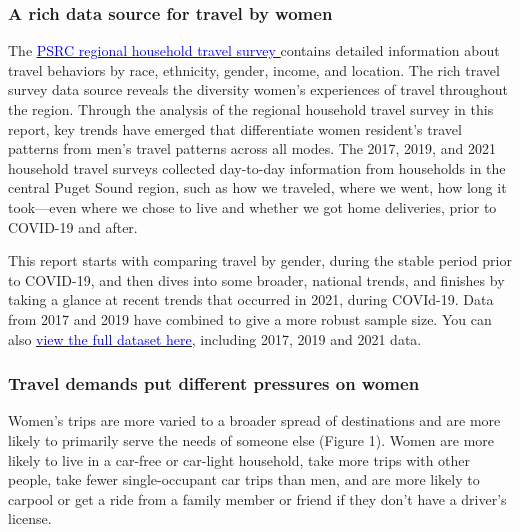 \documentclass[
  12pt,
]{article}
\begin{document}
\hypertarget{a-rich-data-source-for-travel-by-women}{%
\subsubsection{A rich data source for travel by
women}\label{a-rich-data-source-for-travel-by-women}}

\begin{flushleft}
The  \href{https://www.psrc.org/our-work/household-travel-survey-program}{\underline{\textcolor{blue}{PSRC regional household travel survey }}} contains detailed information about travel behaviors by race, ethnicity, gender, income, and location. The rich travel survey data source reveals the diversity women's experiences of travel throughout the region. Through the analysis of the regional household travel survey in this report, key trends have emerged that differentiate women resident's travel patterns from men's travel patterns across all modes. The 2017, 2019, and 2021 household travel surveys collected day-to-day information from households in the central Puget Sound region, such as how we traveled, where we went, how long it took—even where we chose to live and whether we got home deliveries, prior to COVID-19 and after.


This report starts with comparing travel by gender, during the stable period prior to COVID-19, and then dives into some broader, national trends, and finishes by taking a glance at recent trends that occurred in 2021, during COVId-19. Data from 2017 and 2019 have combined to give a more robust sample size.  You can also \href{https://household-travel-survey-psregcncl.hub.arcgis.com}{\underline{\textcolor{blue}{view the full dataset here}}}, including 2017, 2019 and 2021 data. 
\end{flushleft}

\hypertarget{travel-demands-put-different-pressures-on-women}{%
\subsubsection{Travel demands put different pressures on
women}\label{travel-demands-put-different-pressures-on-women}}

\begin{flushleft}
Women's trips are more varied to a broader spread of destinations and are more likely to primarily serve the needs of someone else (Figure 1). Women are more likely to live in a car-free or car-light household, take more trips with other people, take fewer single-occupant car trips than men, and are more likely to carpool or get a ride from a family member or friend if they don’t have a driver’s license. 
\end{flushleft}
\end{document}
